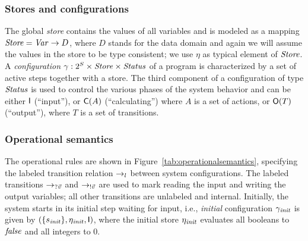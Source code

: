 \subsubsection{Stores and configurations}





The global \emph{store} contains the values of all variables and is
modeled as a mapping $\mathit{Store} = \mathit{Var} \to D$, where $D$ stands for the data
domain and again we will assume the values in the store to be type
consistent; we use $\eta$ as typical element of $\mathit{Store}$. A
\emph{configuration} $\gamma \mathrel{:} 2^S\times \mathit{Store} \times \mathit{Status}$ of a
program is characterized by a set of active steps together with a store.
The third component of a configuration of type $\mathit{Status}$ is used to control
the various phases of the system behavior and can be either $\mathsf{I}$
(``input''), or $\mathsf{C}(A)$ (``calculating'') where $A$ is a set of
actions, or $\mathsf{O}(T)$ (``output''), where $T$ is a set of
transitions.




\subsubsection{Operational semantics}


The operational rules are shown in Figure~\ref{tab:operationalsemantics},
specifying the labeled transition relation $\rightarrow_{l}$ between system
configurations. The labeled transitions $\rightarrow_{?\vec{v}}$ and
$\rightarrow_{!\vec{v}}$ are used to mark reading the input and writing the
output variables; all other transitions are unlabeled and internal.
Initially, the system starts in its initial step waiting for input, i.e., 
\emph{initial} configuration $\gamma_{\mathit{init}}$ is given by
$(\{s_{\mathit{init}}\},\eta_{\mathit{init}},\mathsf{I})$, where the initial store
$\eta_{\mathit{init}}$ evaluates all booleans to $\mathit{false}$ and all integers to $0$.

